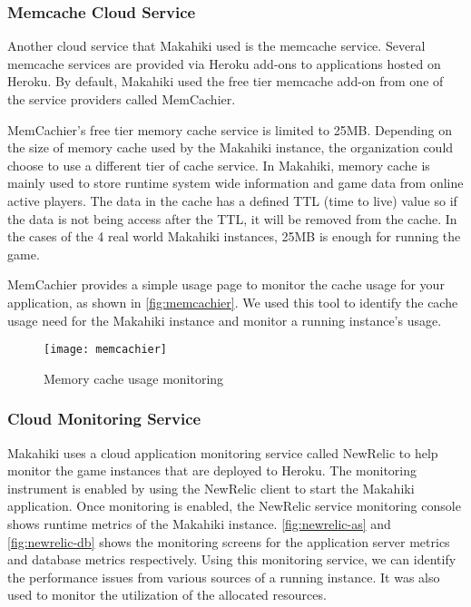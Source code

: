 \subsubsection{Memcache Cloud Service}

Another cloud service that Makahiki used is the memcache service. Several memcache services are provided via Heroku add-ons to applications hosted on Heroku. By default, Makahiki used the free tier memcache add-on from one of the service providers called MemCachier\cite{memcachier}. 

MemCachier's free tier memory cache service is limited to 25MB. Depending on the size of memory cache used by the Makahiki instance, the organization could choose to use a different tier of cache service. In Makahiki, memory cache is mainly used to store  runtime system wide information and game data from online active players. The data in the cache has a defined TTL (time to live) value so if the data is not being access after the TTL, it will be removed from the cache. In the cases of the 4 real world Makahiki instances, 25MB is enough for running the game.

MemCachier provides a simple usage page to monitor the cache usage for your application, as shown in \autoref{fig:memcachier}. We used this tool to identify the cache usage need for the Makahiki instance and monitor a running instance's usage.

\begin{figure}[ht!]
  \center
  \texttt{[image: memcachier]}
  \caption{Memory cache usage monitoring}
  \label{fig:memcachier}
\end{figure}

\subsubsection{Cloud Monitoring Service}

Makahiki uses a cloud application monitoring service called NewRelic to help monitor the game instances that are deployed to Heroku. The monitoring instrument is enabled by using the NewRelic client to start the Makahiki application. Once monitoring is enabled, the NewRelic service monitoring console shows runtime metrics of the Makahiki instance. \autoref{fig:newrelic-as} and \autoref{fig:newrelic-db} shows the monitoring screens for the application server metrics and database metrics respectively. Using this monitoring service, we can identify the performance issues from various sources of a running instance. It was also used to monitor the utilization of the allocated resources.

